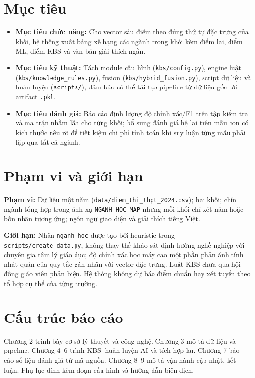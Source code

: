 \section{Mục tiêu}
\begin{itemize}[leftmargin=*]
  \item \textbf{Mục tiêu chức năng:} Cho vector sáu điểm theo đúng thứ tự đặc trưng của khối, hệ thống xuất bảng xế hạng các ngành trong khối kèm điểm lai, điểm ML, điểm KBS và văn bản giải thích ngắn.
  \item \textbf{Mục tiêu kỹ thuật:} Tách module cấu hình (\texttt{kbs/config.py}), engine luật (\texttt{kbs/knowledge\_rules.py}), fusion (\texttt{kbs/hybrid\_fusion.py}), script dữ liệu và huấn luyện (\texttt{scripts/}), đảm bảo có thể tái tạo pipeline từ dữ liệu gốc tới artifact \texttt{.pkl}.
  \item \textbf{Mục tiêu đánh giá:} Báo cáo định lượng độ chính xác/F1 trên tập kiểm tra và ma trận nhầm lẫn cho từng khối; bổ sung đánh giá hệ lai trên mẫu con có kích thước nêu rõ để tiết kiệm chi phí tính toán khi suy luận từng mẫu phải lặp qua tất cả ngành.
\end{itemize}

\section{Phạm vi và giới hạn}
\textbf{Phạm vi:} Dữ liệu một năm (\texttt{data/diem\_thi\_thpt\_2024.csv}); hai khối; chín ngành tổng hợp trong ánh xạ \texttt{NGANH\_HOC\_MAP} nhưng mỗi khối chỉ xét năm hoặc bốn nhãn tương ứng; ngôn ngữ giao diện và giải thích tiếng Việt.

\textbf{Giới hạn:} Nhãn \texttt{nganh\_hoc} được tạo bởi heuristic trong \texttt{scripts/create\_data.py}, không thay thế khảo sát định hướng nghề nghiệp với chuyên gia tâm lý giáo dục; độ chính xác học máy cao một phần phản ánh tính nhất quán của quy tắc gán nhãn với vector đặc trưng. Luật KBS chưa qua hội đồng giáo viên phản biện. Hệ thống không dự báo điểm chuẩn hay xét tuyển theo tổ hợp cụ thể của từng trường.

\section{Cấu trúc báo cáo}
Chương 2 trình bày cơ sở lý thuyết và công nghệ. Chương 3 mô tả dữ liệu và pipeline. Chương 4--6 trình KBS, huấn luyện AI và tích hợp lai. Chương 7 báo cáo số liệu đánh giá từ mã nguồn. Chương 8--9 mô tả vận hành cập nhật, kết luận. Phụ lục đính kèm đoạn cấu hình và hướng dẫn biên dịch.

